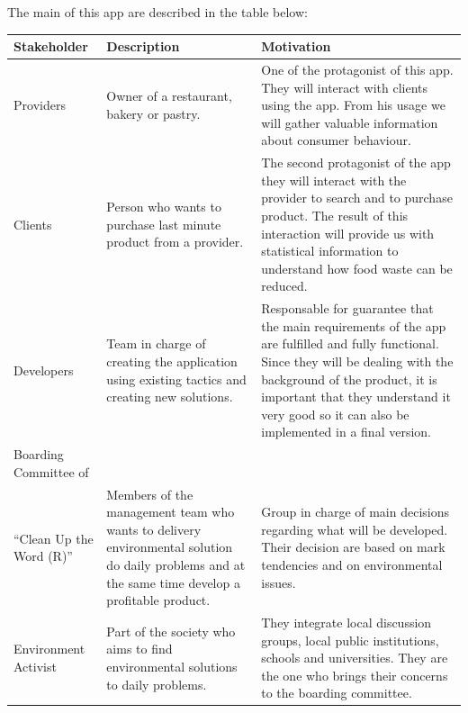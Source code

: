 The main  of this app are described in the table below:

\begin{table}[H]
    \begin{tabularx}{\textwidth}{lXX}
    \toprule
    Stakeholder & Description & Motivation  \\
    \midrule
    Providers & Owner of a restaurant, bakery or pastry. & One of the protagonist of this app. They will interact
    with clients using the app. From his usage we will gather valuable information about consumer behaviour. \\
    Clients & Person who wants to purchase last minute product from a provider. & The second protagonist of the app
    they will interact with the provider to search and to purchase product. The result of this interaction will
    provide us with statistical information to understand how food waste can be reduced.  \\
    Developers & Team in charge of creating the application using existing tactics and creating new solutions.
    & Responsable for guarantee that the main requirements of the app are fulfilled and fully functional. 
    Since they will be dealing with the background of the product, it is important that they understand it very
    good so it can also be implemented in a final version.\\
    Boarding Committee of \\ ``Clean Up the Word (R)'' & Members of the management team who wants to delivery 
    environmental solution do daily problems and at the same time develop a profitable product.
    & Group in charge of main decisions regarding what will be developed. Their decision are based on mark tendencies
    and on environmental issues.  \\
    Environment Activist & Part of the society who aims to find environmental solutions to daily problems.
    & They integrate local discussion groups, local public institutions, schools and universities. 
    They are the one who brings their concerns to the boarding committee. \\
    \bottomrule
    \end{tabularx}
\end{table}